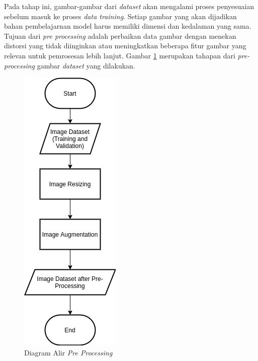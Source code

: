 \documentclass[conference]{IEEEtran}
\begin{document}
	Pada tahap ini, gambar-gambar dari \textit{dataset} akan mengalami proses penyesuaian sebelum masuk ke proses \textit{data training}. Setiap gambar yang akan dijadikan bahan pembelajarnan model harus memiliki dimensi dan kedalaman yang sama. Tujuan dari \textit{pre processing} adalah perbaikan data gambar dengan menekan distorsi yang tidak diinginkan atau meningkatkan beberapa fitur gambar yang relevan untuk pemrosesan lebih lanjut. Gambar \ref{fig:preprocessing} merupakan tahapan dari \textit{pre-processing} gambar \textit{dataset} yang dilakukan.
	
	\begin{figure}[h]
		\centering
		\includegraphics[scale=0.3]{img/flowchart-preprocessing.png}
		\caption{Diagram Alir \textit{Pre Processing}}
		\label{fig:preprocessing}
	\end{figure}
	
\end{document}
